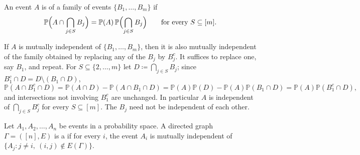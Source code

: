 \begin{definition}\label{def:mutually-independent}
    An event \(A\) is  of a family of events \(\{ B_{1}, \ldots, B_{m} \}\) if
    \[
        \mathbb{P}\Bigl( A \cap \bigcap_{j \in S} B_{j} \Bigr) = \mathbb{P}(A) \, \mathbb{P}\Bigl( \bigcap_{j \in S} B_{j} \Bigr)
        \qquad \text{for every } S \subseteq [m] .
    \]
\end{definition}

\begin{remark}\label{rmk:mutual-indep-complements}
    If \(A\) is mutually independent of \(\{ B_{1}, \ldots, B_{m} \}\), then it is also mutually independent of the family obtained by replacing any of the \(B_{j}\) by \(B_{j}^{c}\). It suffices to replace one, say \(B_{1}\), and repeat. For \(S \subseteq \{2, \ldots, m\}\) let \(D \coloneqq \bigcap_{j \in S} B_{j}\); since \(B_{1}^{c} \cap D = D \setminus (B_{1} \cap D)\),
    \[
        \mathbb{P}(A \cap B_{1}^{c} \cap D)
        = \mathbb{P}(A \cap D) - \mathbb{P}(A \cap B_{1} \cap D)
        = \mathbb{P}(A) \mathbb{P}(D) - \mathbb{P}(A) \mathbb{P}(B_{1} \cap D)
        = \mathbb{P}(A) \mathbb{P}(B_{1}^{c} \cap D) ,
    \]
    and intersections not involving \(B_{1}^{c}\) are unchanged. In particular \(A\) is independent of \(\bigcap_{j \in S} B_{j}^{c}\) for every \(S \subseteq [m]\). The \(B_{j}\) need not be independent of each other.
\end{remark}

\begin{definition}\label{def:dependency-digraph}
    Let \(A_{1}, A_{2}, \ldots, A_{n}\) be events in a probability space. A directed graph \(\Gamma = ([n], E)\) is a  if for every \(i\), the event \(A_{i}\) is mutually independent of \(\{ A_{j} : j \ne i,\ (i,j) \notin E(\Gamma) \}\).
\end{definition}

